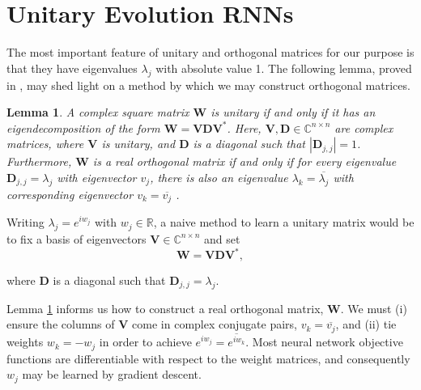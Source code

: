 \documentclass{article} %
\newcommand{\matr}[1]{\mathbf{#1}}
\newcommand\RR{\mathbb{R}}
\newtheorem{lemma}{Lemma}
\begin{document}
%
%
%
%
%

\section{Unitary Evolution RNNs}

The most important feature of unitary and orthogonal matrices for our purpose is that they have eigenvalues
$\lambda_j$ with absolute value 1. The following lemma, proved in \cite{linalgbook}, may shed light on a 
method by which we may construct orthogonal matrices.

\begin{lemma}
  A complex square matrix $\matr{W}$ is unitary if and only if it has an eigendecomposition of the form
  $\matr{W} = \matr{V} \matr{D} \matr{V}^*$. Here, $\matr{V}, \matr{D} \in \mathbb{C}^{n \times n}$ are
  complex matrices, where $\matr{V}$ is unitary, and $\matr{D}$ is a diagonal such that $|\matr{D}_{j,j}|=1$. 
  Furthermore, $\matr{W}$ is a real orthogonal matrix if and only if for every eigenvalue $\matr{D}_{j,j} 
  = \lambda_j$ with eigenvector $v_j$, there is also an eigenvalue $\lambda_k = \overline{\lambda_j}$ with 
  corresponding eigenvector $v_k = \overline{v_j}$ .
\label{lemma}
\end{lemma}

Writing $\lambda_j = e^{i w_j}$ with $w_j \in \RR$, a naive method to learn a unitary matrix would be to
fix a basis of eigenvectors $\matr{V} \in \mathbb{C}^{n \times n}$ and set
\begin{equation} \matr{W} = \matr{V} \matr{D} \matr{V}^{*} , \end{equation}

where $\matr{D}$ is a diagonal such that $\matr{D}_{j,j} = \lambda_j$. 

Lemma \ref{lemma} informs us how to construct a real orthogonal matrix, $\matr{W}$.
We must (i) ensure the columns of $\matr{V}$ come in complex conjugate pairs, $v_k = \overline{v_j}$, and
(ii) tie weights $w_k=-w_j$ in order to achieve $e^{i w_j} = \overline{e^{i w_k}}$. 
Most neural network objective functions are differentiable with respect to the weight matrices,
and consequently $w_j$ may be learned by gradient descent. 
\end{document}
